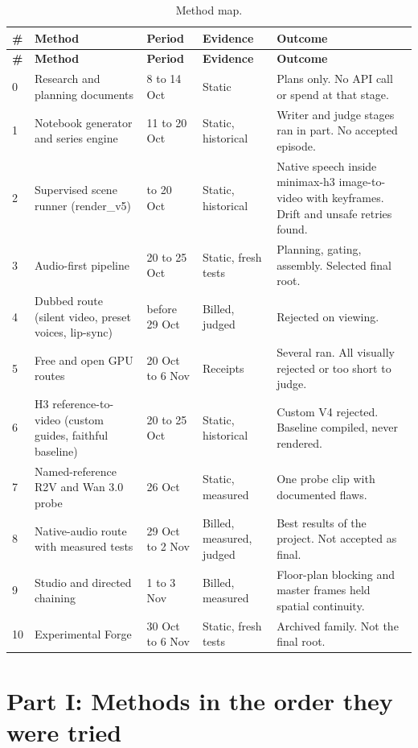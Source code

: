 \documentclass[11pt,a4paper]{article}
\begin{document}
\begin{longtable}{@{}P{0.6cm}P{3.3cm}P{3.0cm}P{2.6cm}P{4.7cm}@{}}
\caption{Method map.\label{tab:map}}\\
\toprule \textbf{\#} & \textbf{Method} & \textbf{Period} & \textbf{Evidence} & \textbf{Outcome}\\ \midrule \endfirsthead
\toprule \textbf{\#} & \textbf{Method} & \textbf{Period} & \textbf{Evidence} & \textbf{Outcome}\\ \midrule {} & Research and planning documents & 8 to 14 Oct & Static & Plans only. No API call or spend at that stage.\\
1 & Notebook generator and series engine & 11 to 20 Oct & Static, historical & Writer and judge stages ran in part. No accepted episode.\\
2 & Supervised scene runner (render\_v5) & to 20 Oct & Static, historical & Native speech inside minimax-h3 image-to-video with keyframes. Drift and unsafe retries found.\\
3 & Audio-first pipeline & 20 to 25 Oct & Static, fresh tests & Planning, gating, assembly. Selected final root.\\
4 & Dubbed route (silent video, preset voices, lip-sync) & before 29 Oct & Billed, judged & Rejected on viewing.\\
5 & Free and open GPU routes & 20 Oct to 6 Nov & Receipts & Several ran. All visually rejected or too short to judge.\\
6 & H3 reference-to-video (custom guides, faithful baseline) & 20 to 25 Oct & Static, historical & Custom V4 rejected. Baseline compiled, never rendered.\\
7 & Named-reference R2V and Wan 3.0 probe & 26 Oct & Static, measured & One probe clip with documented flaws.\\
8 & Native-audio route with measured tests & 29 Oct to 2 Nov & Billed, measured, judged & Best results of the project. Not accepted as final.\\
9 & Studio and directed chaining & 1 to 3 Nov & Billed, measured & Floor-plan blocking and master frames held spatial continuity.\\
10 & Experimental Forge & 30 Oct to 6 Nov & Static, fresh tests & Archived family. Not the final root.\\
\bottomrule
\end{longtable}
\part*{Part I: Methods in the order they were tried}
\end{document}
